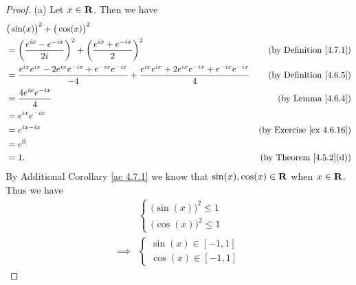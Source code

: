 \begin{proof}{(a)}
    Let \(x \in \mathbf{R}\).
    Then we have
    \begin{align*}
         & \big(\sin(x)\big)^2 + \big(\cos(x)\big)^2                                                                                                                                               \\
         & = \bigg(\frac{e^{i x} - e^{- i x}}{2i}\bigg)^2 + \bigg(\frac{e^{i x} + e^{- i x}}{2}\bigg)^2                                                     & \text{(by Definition \ref{4.7.1})}   \\
         & = \frac{e^{i x} e^{i x} - 2 e^{i x} e^{- i x} + e^{- i x} e^{- i x}}{-4} + \frac{e^{i x} e^{i x} + 2 e^{i x} e^{- i x} + e^{- i x} e^{- i x}}{4} & \text{(by Definition \ref{4.6.5})}   \\
         & = \frac{4 e^{i x} e^{- i x}}{4}                                                                                                                  & \text{(by Lemma \ref{4.6.4})}        \\
         & = e^{i x} e^{- i x}                                                                                                                                                                     \\
         & = e^{i x - i x}                                                                                                                                  & \text{(by Exercise \ref{ex 4.6.16})} \\
         & = e^0                                                                                                                                                                                   \\
         & = 1.                                                                                                                                             & \text{(by Theorem \ref{4.5.2}(d))}
    \end{align*}
    By Additional Corollary \ref{ac 4.7.1} we know that \(\sin(x), \cos(x) \in \mathbf{R}\) when \(x \in \mathbf{R}\).
    Thus we have
    \begin{align*}
                 & \begin{cases}
                       \big(\sin(x)\big)^2 \leq 1 \\
                       \big(\cos(x)\big)^2 \leq 1
                   \end{cases} \\
        \implies & \begin{cases}
                       \sin(x) \in [-1, 1] \\
                       \cos(x) \in [-1, 1]
                   \end{cases}
    \end{align*}
\end{proof}

